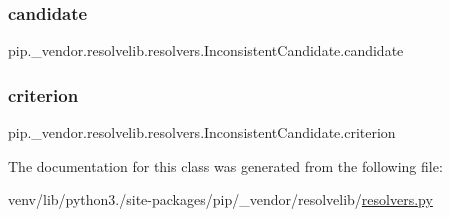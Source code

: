 \subsubsection{\texorpdfstring{candidate}{candidate}}
{\footnotesize\ttfamily pip.\+\_\+vendor.\+resolvelib.\+resolvers.\+Inconsistent\+Candidate.\+candidate}

\mbox{\label{classpip_1_1__vendor_1_1resolvelib_1_1resolvers_1_1InconsistentCandidate_a61c6cba1e1914bd166d05cd8ff207e05}} 
\subsubsection{\texorpdfstring{criterion}{criterion}}
{\footnotesize\ttfamily pip.\+\_\+vendor.\+resolvelib.\+resolvers.\+Inconsistent\+Candidate.\+criterion}



The documentation for this class was generated from the following file\+:\begin{DoxyCompactItemize}
\item 
venv/lib/python3./site-\/packages/pip/\+\_\+vendor/resolvelib/\hyperlink{resolvers_8py}{resolvers.\+py}\end{DoxyCompactItemize}
